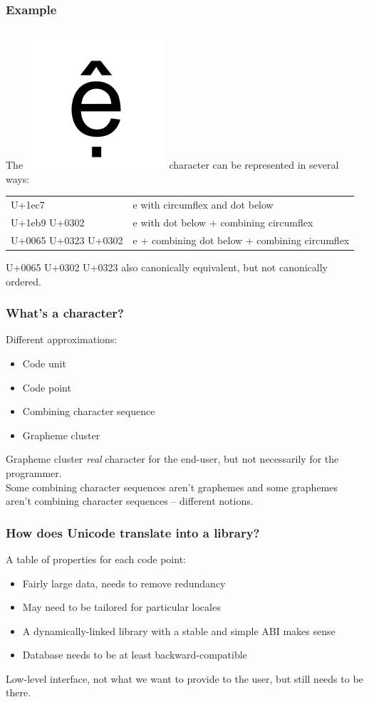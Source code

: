\documentclass{beamer}
\begin{document}
\begin{frame}
	\frametitle{Example}
	
	The \includegraphics[scale=0.07]{1EC7.png} character can be represented in several ways:
	
	\bigskip
	\small{
	\begin{tabular}{ll}
	U+1ec7 & e with circumflex and dot below\\
	U+1eb9 U+0302 & e with dot below + combining circumflex\\ 
	U+0065 U+0323 U+0302 & e + combining dot below + combining circumflex
	\end{tabular} }
	\bigskip
	
	U+0065 U+0302 U+0323 also canonically equivalent, but not canonically ordered.
	\bigskip
\end{frame}

\begin{frame}
	\frametitle{What's a character?}
	
	Different approximations:
	\begin{itemize}
		\item Code unit
		\item Code point
		\item Combining character sequence
		\item Grapheme cluster
	\end{itemize}
	\bigskip
	
	Grapheme cluster \textit{real} character for the end-user, but not necessarily for the programmer.\\
	Some combining character sequences aren't graphemes and some graphemes aren't combining character sequences -- different notions.
	
\end{frame}

\begin{frame}
	\frametitle{How does Unicode translate into a library?}
	
	A table of properties for each code point:
	\begin{itemize}
		\item Fairly large data, needs to remove redundancy
		\item May need to be tailored for particular locales
		\item A dynamically-linked library with a stable and simple ABI makes sense
		\item Database needs to be at least backward-compatible
	\end{itemize}
	\bigskip
	
	Low-level interface, not what we want to provide to the user, but still needs to be there.
\end{frame}
\end{document}
